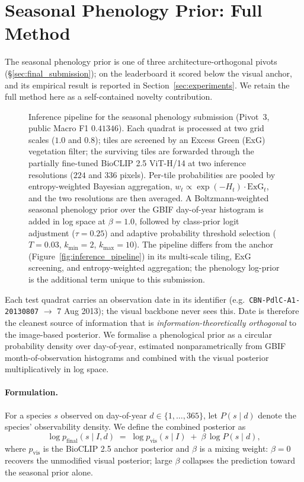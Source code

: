 \section{Seasonal Phenology Prior: Full Method}
\label{sec:phenology}

The seasonal phenology prior is one of three architecture-orthogonal pivots
(\S\ref{sec:final_submission}); on the leaderboard it scored below the visual anchor, and its
empirical result is reported in Section~\ref{sec:experiments}. We retain the full method here as
a self-contained novelty contribution.

\begin{figure}[!htbp]
  \centering
  \resizebox{0.82\linewidth}{!}{}
  \caption{Inference pipeline for the seasonal phenology submission (Pivot~3, public Macro F1 $0.41346$). Each quadrat is processed at two grid scales ($1.0$ and $0.8$); tiles are screened by an Excess Green (ExG) vegetation filter; the surviving tiles are forwarded through the partially fine-tuned BioCLIP 2.5 ViT-H/14 at two inference resolutions ($224$ and $336$ pixels). Per-tile probabilities are pooled by entropy-weighted Bayesian aggregation, $w_t \propto \exp(-H_t)\cdot\mathrm{ExG}_t$, and the two resolutions are then averaged. A Boltzmann-weighted seasonal phenology prior over the GBIF day-of-year histogram is added in log space at $\beta{=}1.0$, followed by class-prior logit adjustment ($\tau{=}0.25$) and adaptive probability threshold selection ($T{=}0.03$, $k_{\min}{=}2$, $k_{\max}{=}10$). The pipeline differs from the anchor (Figure~\ref{fig:inference_pipeline}) in its multi-scale tiling, ExG screening, and entropy-weighted aggregation; the phenology log-prior is the additional term unique to this submission.}
  \label{fig:phenology_pipeline}
\end{figure}

Each test quadrat carries an observation date in its identifier (e.g.\ \texttt{CBN-PdlC-A1-20130807} $\to$ 7 Aug 2013); the visual backbone never sees this. Date is therefore the cleanest source of information that is \emph{information-theoretically orthogonal} to the image-based posterior. We formalise a phenological prior as a circular probability density over day-of-year, estimated nonparametrically from GBIF month-of-observation histograms and combined with the visual posterior multiplicatively in log space.

\paragraph{Formulation.} For a species $s$ observed on day-of-year $d \in \{1,\ldots,365\}$, let $P(s \mid d)$ denote the species' observability density. We define the combined posterior as
\begin{equation}
  \log p_{\text{final}}(s \mid I, d) \;=\; \log p_{\text{vis}}(s \mid I) \;+\; \beta \,\log P(s \mid d),
\end{equation}
where $p_{\text{vis}}$ is the BioCLIP 2.5 anchor posterior and $\beta$ is a mixing weight: $\beta{=}0$ recovers the unmodified visual posterior; large $\beta$ collapses the prediction toward the seasonal prior alone.

